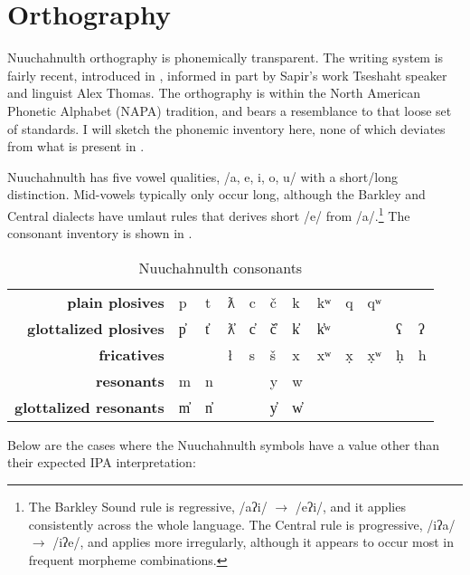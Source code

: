 \chapter{Orthography} \label{appendix:orthography}

Nuuchahnulth orthography is phonemically transparent. The writing system is fairly recent, introduced in \citet{sapir1939}, informed in part by Sapir's work Tseshaht speaker and linguist Alex Thomas. The orthography is within the North American Phonetic Alphabet (NAPA) tradition, and bears a resemblance to that loose set of standards. I will sketch the phonemic inventory here, none of which deviates from what is present in \citet{carlson2001}.

Nuuchahnulth has five vowel qualities, /a, e, i, o, u/ with a short/long distinction. Mid-vowels typically only occur long, although the Barkley and Central dialects have umlaut rules that derives short /e/ from /a/.\footnote{The Barkley Sound rule is regressive, /aʔi/ $\rightarrow$ /eʔi/, and it applies consistently across the whole language. The Central rule is progressive, /iʔa/ $\rightarrow$ /iʔe/, and applies more irregularly, although it appears to occur most in frequent morpheme combinations.} The consonant inventory is shown in .

\begin{table}[ht]
\centering
\caption{Nuuchahnulth consonants}
\label{table:cons}
\begin{tabular}{rlllllllllll}
\textbf{plain plosives} & p  & t  & ƛ  & c  & č  & k  & kʷ  & q  & qʷ \\
\textbf{glottalized plosives} & p̓ & t̓ & ƛ̓ & c̓ & č̓ & k̓ & k̓ʷ & &  & ʕ  &  ʔ  \\
\textbf{fricatives} &   &    & ł  & s  & š  & x  & xʷ  & x̣ & x̣ʷ & ḥ & h \\
\textbf{resonants} & m  &  n  &  &  & y   & w  &     &    &     &    &   \\
\textbf{glottalized resonants} & m̓ &   n̓ &  &  & y̓  & w̓ &     &    &     &    &  
\end{tabular}
\end{table}

Below are the cases where the Nuuchahnulth symbols have a value other than their expected IPA interpretation:

